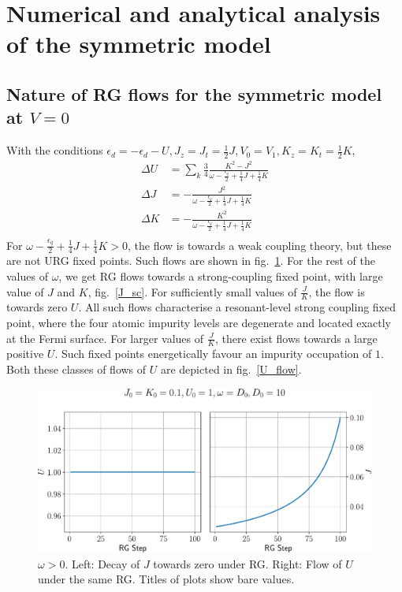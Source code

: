 \documentclass[12pt,twoside]{report}
\numberwithin{equation}{section}
\begin{document}
\section{Numerical and analytical analysis of the symmetric model}
\subsection{Nature of RG flows for the symmetric model at \(V = 0\)}
With the conditions \(\epsilon_d = -\epsilon_d - U, J_z = J_t = \frac{1}{2}J, V_0 = V_1, K_z = K_t = \frac{1}{2}K\),
\begin{equation}\begin{aligned}
	\Delta U &= \sum_k \frac{3}{4}\frac{K^2 - J^2}{\omega - \frac{\epsilon_q}{2} + \frac{1}{4}J + \frac{1}{4}K} \\
	\Delta J &= - \frac{J^2}{\omega - \frac{\epsilon_q}{2} + \frac{1}{4}J + \frac{1}{4}K}\\
	\Delta K &= - \frac{K^2}{\omega - \frac{\epsilon_q}{2} + \frac{1}{4}J + \frac{1}{4}K}\\
\end{aligned}\end{equation}
For \(\omega - \frac{\epsilon_q}{2} + \frac{1}{4}J + \frac{1}{4}K > 0\), the flow is towards a weak coupling theory, but these are not URG fixed points. Such flows are shown in fig.~\ref{Jdecay}. For the rest of the values of \(\omega\), we get RG flows towards a strong-coupling fixed point, with large value of \(J\) and \(K\), fig.~\ref{J_sc}. For sufficiently small values of \(\frac{J}{K}\), the flow is towards zero \(U\). All such flows characterise a resonant-level strong coupling fixed point, where the four atomic impurity levels are degenerate and located exactly at the Fermi surface. For larger values of \(\frac{J}{K}\), there exist flows towards a large positive \(U\). Such fixed points energetically favour an impurity occupation of \(1\). Both these classes of flows of \(U\) are depicted in fig.~\ref{U_flow}.
\begin{figure}[htpb]
	\centering
	\includegraphics[width=\textwidth]{../figures/large_w.pdf}
	\caption{\(\omega > 0\). Left: Decay of \(J\) towards zero under RG. Right: Flow of \(U\) under the same RG. Titles of plots show bare values.}
	\label{Jdecay}
\end{figure}
\end{document}
